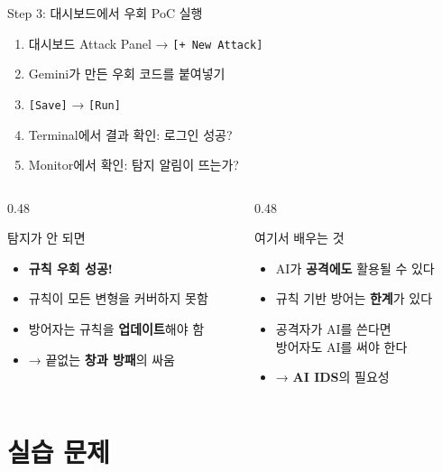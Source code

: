 \documentclass[aspectratio=169,10pt]{beamer}
\newcommand{\hlt}[1]{\textcolor{accent}{\textbf{#1}}}
\begin{document}
\begin{frame}{Step 3: 대시보드에서 우회 PoC 실행}

\begin{enumerate}
    \item 대시보드 Attack Panel → \texttt{[+ New Attack]}
    \item Gemini가 만든 우회 코드를 붙여넣기
    \item \texttt{[Save]} → \texttt{[Run]}
    \item Terminal에서 결과 확인: 로그인 성공?
    \item Monitor에서 확인: 탐지 알림이 뜨는가?
\end{enumerate}

\vspace{0.5em}
\begin{columns}[T]
\begin{column}{0.48\textwidth}
\begin{block}{탐지가 안 되면}
\begin{itemize}
    \item \hlt{규칙 우회 성공!}
    \item 규칙이 모든 변형을 커버하지 못함
    \item 방어자는 규칙을 \textbf{업데이트}해야 함
    \item → 끝없는 \hlt{창과 방패}의 싸움
\end{itemize}
\end{block}
\end{column}
\begin{column}{0.48\textwidth}
\begin{block}{여기서 배우는 것}
\begin{itemize}
    \item AI가 \textbf{공격에도} 활용될 수 있다
    \item 규칙 기반 방어는 \textbf{한계}가 있다
    \item 공격자가 AI를 쓴다면\\방어자도 AI를 써야 한다
    \item → \textbf{AI IDS}의 필요성
\end{itemize}
\end{block}
\end{column}
\end{columns}
\end{frame}

\section{실습 문제}
\end{document}
